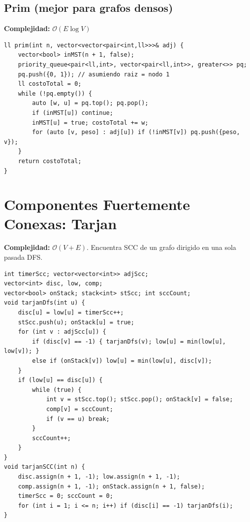 \documentclass[10pt,twocolumn,letterpaper]{report}
\begin{document}
\subsection{Prim (mejor para grafos densos)}
\textbf{Complejidad:} $\mathcal{O}(E \log V)$
\begin{lstlisting}
ll prim(int n, vector<vector<pair<int,ll>>>& adj) {
    vector<bool> inMST(n + 1, false);
    priority_queue<pair<ll,int>, vector<pair<ll,int>>, greater<>> pq;
    pq.push({0, 1}); // asumiendo raiz = nodo 1
    ll costoTotal = 0;
    while (!pq.empty()) {
        auto [w, u] = pq.top(); pq.pop();
        if (inMST[u]) continue;
        inMST[u] = true; costoTotal += w;
        for (auto [v, peso] : adj[u]) if (!inMST[v]) pq.push({peso, v});
    }
    return costoTotal;
}
\end{lstlisting}

\section{Componentes Fuertemente Conexas: Tarjan}
\textbf{Complejidad:} $\mathcal{O}(V + E)$. Encuentra SCC de un grafo dirigido en una sola pasada DFS.
\begin{lstlisting}
int timerScc; vector<vector<int>> adjScc;
vector<int> disc, low, comp;
vector<bool> onStack; stack<int> stScc; int sccCount;
void tarjanDfs(int u) {
    disc[u] = low[u] = timerScc++;
    stScc.push(u); onStack[u] = true;
    for (int v : adjScc[u]) {
        if (disc[v] == -1) { tarjanDfs(v); low[u] = min(low[u], low[v]); }
        else if (onStack[v]) low[u] = min(low[u], disc[v]);
    }
    if (low[u] == disc[u]) {
        while (true) {
            int v = stScc.top(); stScc.pop(); onStack[v] = false;
            comp[v] = sccCount;
            if (v == u) break;
        }
        sccCount++;
    }
}
void tarjanSCC(int n) {
    disc.assign(n + 1, -1); low.assign(n + 1, -1);
    comp.assign(n + 1, -1); onStack.assign(n + 1, false);
    timerScc = 0; sccCount = 0;
    for (int i = 1; i <= n; i++) if (disc[i] == -1) tarjanDfs(i);
}
\end{lstlisting}

\end{document}
